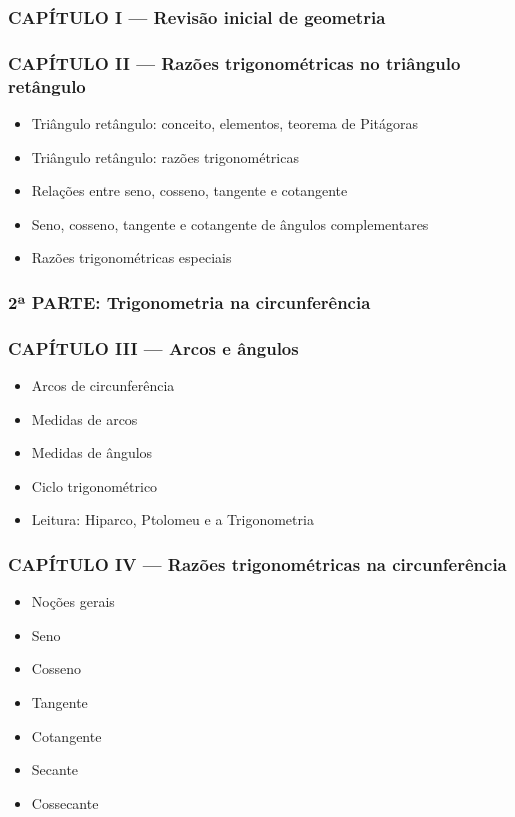 \documentclass[a4paper,12pt]{article}[abntex2]
\begin{document}
\subsubsection*{CAPÍTULO I — Revisão inicial de geometria}

\subsubsection*{CAPÍTULO II — Razões trigonométricas no triângulo retângulo}

\begin{itemize}
\item Triângulo retângulo: conceito, elementos, teorema de Pitágoras
\item Triângulo retângulo: razões trigonométricas
\item Relações entre seno, cosseno, tangente e cotangente
\item Seno, cosseno, tangente e cotangente de ângulos complementares
\item Razões trigonométricas especiais
\end{itemize}
\subsubsection*{2ª PARTE: Trigonometria na circunferência}

\subsubsection*{CAPÍTULO III — Arcos e ângulos}

\begin{itemize}
\item Arcos de circunferência
\item Medidas de arcos
\item Medidas de ângulos
\item Ciclo trigonométrico
\item Leitura: Hiparco, Ptolomeu e a Trigonometria
\end{itemize}
\subsubsection*{CAPÍTULO IV — Razões trigonométricas na circunferência}

\begin{itemize}
\item Noções gerais
\item Seno
\item Cosseno
\item Tangente
\item Cotangente
\item Secante
\item Cossecante
\end{itemize}
\end{document}
